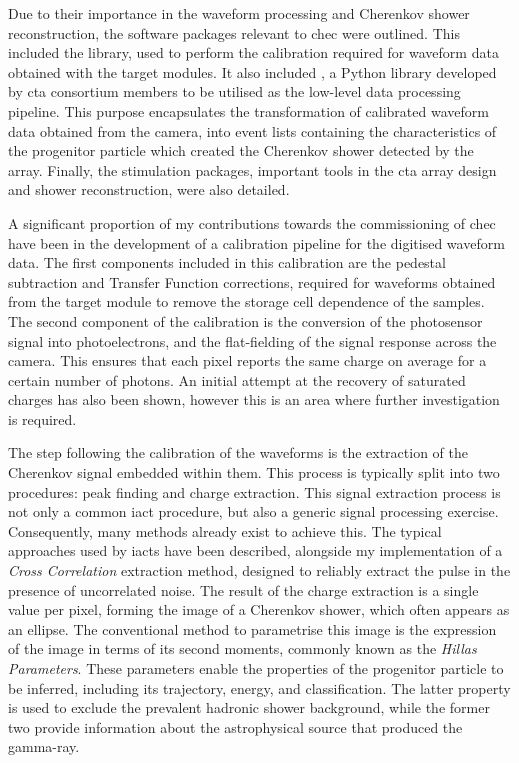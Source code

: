 Due to their importance in the waveform processing and Cherenkov shower reconstruction, the software packages relevant to \gls{chec} were outlined. This included the  library, used to perform the calibration required for waveform data obtained with the \gls{target} modules. It also included , a Python library developed by \gls{cta} consortium members to be utilised as the low-level data processing pipeline. This purpose encapsulates the transformation of calibrated waveform data obtained from the camera, into event lists containing the characteristics of the progenitor particle which created the Cherenkov shower detected by the array. Finally, the stimulation packages, important tools in the \gls{cta} array design and shower reconstruction, were also detailed.

A significant proportion of my contributions towards the commissioning of \gls{chec} have been in the development of a calibration pipeline for the digitised waveform data. The first components included in this calibration are the pedestal subtraction and Transfer Function corrections, required for waveforms obtained from the \gls{target} module to remove the storage cell dependence of the samples. The second component of the calibration is the conversion of the photosensor signal into photoelectrons, and the flat-fielding of the signal response across the camera. This ensures that each pixel reports the same charge on average for a certain number of photons. An initial attempt at the recovery of saturated charges has also been shown, however this is an area where further investigation is required.

The step following the calibration of the waveforms is the extraction of the Cherenkov signal embedded within them. This process is typically split into two procedures: peak finding and charge extraction. This signal extraction process is not only a common \gls{iact} procedure, but also a generic signal processing exercise. Consequently, many methods already exist to achieve this. The typical approaches used by \glspl{iact} have been described, alongside my implementation of a \textit{Cross Correlation} extraction method, designed to reliably extract the pulse in the presence of uncorrelated noise. The result of the charge extraction is a single value per pixel, forming the image of a Cherenkov shower, which often appears as an ellipse. The conventional method to parametrise this image is the expression of the image in terms of its second moments, commonly known as the \textit{Hillas Parameters}. These parameters enable the properties of the progenitor particle to be inferred, including its trajectory, energy, and classification. The latter property is used to exclude the prevalent hadronic shower background, while the former two provide information about the astrophysical source that produced the gamma-ray.

